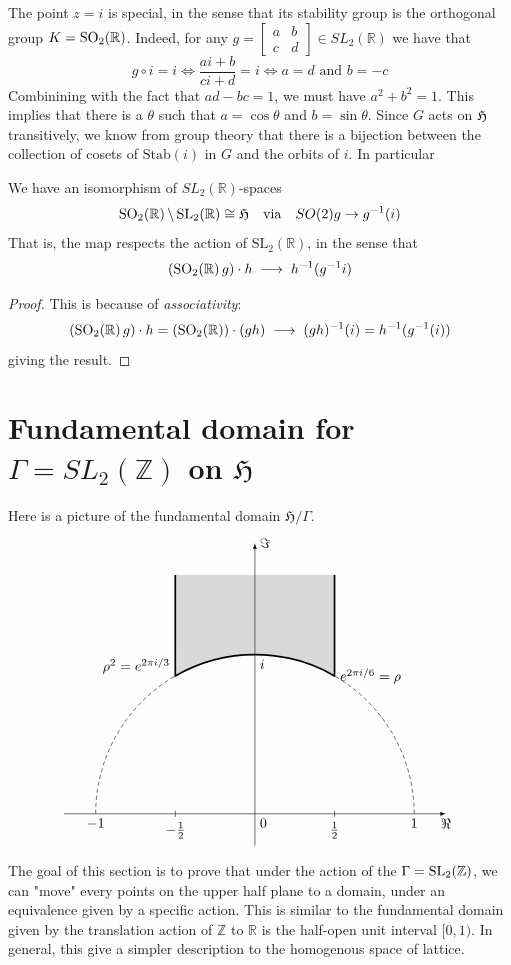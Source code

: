The point $z = i$ is special, in the sense that its stability group is the orthogonal group $K =\SO2$. Indeed, for any \(g = \begin{bmatrix}a & b \\ c & d\end{bmatrix} \in SL_{2}(\mathbb{R})\)  we have
that
\[g \circ i = i \Leftrightarrow \dfrac{ai+b}{ci+d }=i \Leftrightarrow a=d \text{ and } b = -c \]
Combinining with the fact that $ad-bc=1$, we must have $a^2 + b^2=1$. This implies that there is a $\theta$ such that $a = \cos\theta$ and $b = \sin \theta$.
Since $G$ acts on $\operatorname{\mathfrak{H}}$ transitively, we know from group theory that there is a bijection between the collection of cosets of
$\text{Stab}(i)$ in $G$ and the orbits of $i$. In particular
\begin{prop}\label{upper-group}
  We have an isomorphism of \(SL_{2}(\mathbb{R})\)-spaces
  \[
    \SO2\backslash\SL2 \cong \mathfrak{H} \quad \text{via} \quad  SO(2)g \to g^{-1}(i)
  \]
  That is, the map respects the action of \(\text{SL}_{2}(\mathbb{R})\), in the sense that
  \[
    (\SO2 g)\cdot h \;\longrightarrow\; h^{-1}(g^{-1}i)
  \]
\end{prop}
\begin{proof}
  This is because of \textit{associativity}:
  \[
    (\SO2 g)\cdot h  = (\SO2)\cdot (gh)  \;\longrightarrow\; (gh)^{-1}(i) = h^{-1}(g^{-1}(i))
  \]
  giving the result.
\end{proof}
\section{Fundamental domain for $\Gamma = SL_2(\mathbb{Z})$ on $\mathfrak{H}$}
Here is a picture of the fundamental domain $\mathfrak{H}/\Gamma$.
\[
  \begin{tikzpicture}[scale=4]
    \draw[densely dashed] (1,0) arc (0:60:1) (-1,0) arc (180:120:1);
    \draw[very thick, fill=gray!30] (.5,1.5) --node[right, pos=1]{$e^{2\pi i/6}=\rho$} (60:1) arc (60:120:1)
    --node[left, pos=.1]{$\rho^2=e^{2\pi i/3}$} (-.5,1.5);
    \draw[-latex] (-1.2,0) -- (1.2,0)node[below]{$\Re$};
    \draw[-latex] (0,-.2) -- (0,1.7)node[right]{$\Im$};
    \path(-1,0) --node[below, pos=0]{$-1$}node[below right, pos=.5]{0}node[below, pos=1]{1} (1,0)
    (0,1)node[below right]{$i$};
    \draw(-.5,.02)--(-.5,-.02)node[below]{$-\frac{1}{2}$}(.5,.02)--(.5,-.02)node[below]{$\frac{1}{2}$};
  \end{tikzpicture}\]
The goal of this section is to prove that under the action of the $\Gamma = \operatorname{SL_2(\mathbb{Z})}$, we can "move"
every points on the upper half plane to a domain, under an equivalence given by a specific action.
This is similar to the fundamental domain given by the translation action of $\mathbb{Z}$ to $\mathbb{R}$ is the half-open
unit interval $[0,1)$. In general, this give a simpler description to the homogenous space of lattice.

